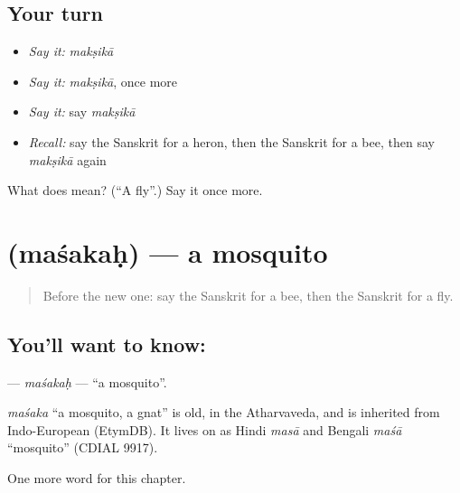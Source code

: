 \subsection*{Your turn}
\begin{itemize}
\raggedright
  \item \emph{Say it:} \emph{makṣikā}
  \item \emph{Say it:} \emph{makṣikā}, once more
  \item \emph{Say it:} say \emph{makṣikā}
  \item \emph{Recall:} say the Sanskrit for a heron, then the Sanskrit for a bee, then say \emph{makṣikā} again
\end{itemize}

\begin{tcolorbox}[breakable,colback=teal!4,colframe=teal!35!black,title={Before you move on}]
What does  mean? (\textquotedblleft{}A fly\textquotedblright{}.) Say it once more.
\end{tcolorbox}
\section[\texorpdfstring{\sk{मशकः} (maśakaḥ)}{मशकः (maśakaḥ)}]{ (maśakaḥ) — a mosquito}

\label{lesson:SA-C115-masakah}



\begin{quote}
Before the new one: say the Sanskrit for a bee, then the Sanskrit for a fly.
\end{quote}

\subsection*{You'll want to know: }
\textbf{} — \emph{maśakaḥ} — \textquotedblleft{}a mosquito\textquotedblright{}.

\begin{cousinweb}
\emph{maśaka} \textquotedblleft{}a mosquito, a gnat\textquotedblright{} is old, in the Atharvaveda, and is inherited from Indo-European (EtymDB). It lives on as Hindi \emph{masā} and Bengali \emph{maśā} \textquotedblleft{}mosquito\textquotedblright{} (CDIAL 9917).
\end{cousinweb}

\begin{grammarlens}[title={What you've built}]
One more word for this chapter.
\end{grammarlens}

